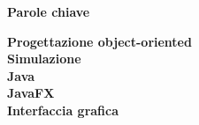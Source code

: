 
\clearemptydoublepage
\thispagestyle{empty}
\vspace*{20ex}
\begin{flushright}
    \begin{LARGE}
        \textbf{Parole chiave}\\
        \vspace{5ex}
    \end{LARGE}
    \begin{normalsize}
        \textbf{%
            Progettazione object-oriented\\%
            \medskip
            Simulazione\\%
            \medskip
            Java\\%
            \medskip
            JavaFX\\%
            \medskip
            Interfaccia grafica%
        }
    \end{normalsize}
\end{flushright}
\vfill
